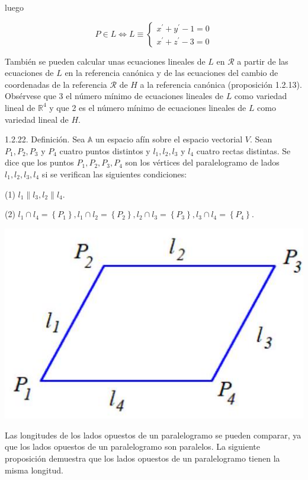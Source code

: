 \documentclass[12pt, a4paper, ones, notitlepage, openany,titlepage]{article}
\begin{document}
luego

$$
P \in L \Longleftrightarrow L \equiv\left\{\begin{array}{l}
x^{\prime}+y^{\prime}-1=0 \\
x^{\prime}+z^{\prime}-3=0
\end{array}\right.
$$

También se pueden calcular unas ecuaciones lineales de $L$ en $\mathcal{R}$ a partir de las ecuaciones de $L$ en la referencia canónica y de las ecuaciones del cambio de coordenadas de la referencia $\mathcal{R}$ de $H$ a la referencia canónica (proposición 1.2.13). Obsérvese que 3 el número mínimo de ecuaciones lineales de $L$ como variedad lineal de $\mathbb{R}^{4}$ y que 2 es el número mínimo de ecuaciones lineales de $L$ como variedad lineal de $H$.

1.2.22. Definición. Sea $\mathbb{A}$ un espacio afín sobre el espacio vectorial $V$. Sean $P_{1}, P_{2}, P_{3}$ y $P_{4}$ cuatro puntos distintos y $l_{1}, l_{2}, l_{3}$ y $l_{4}$ cuatro rectas distintas. Se dice que los puntos $P_{1}, P_{2}, P_{3}, P_{4}$ son los vértices del paralelogramo de lados $l_{1}, l_{2}, l_{3}, l_{4}$ si se verifican las siguientes condiciones:

(1) $l_{1}\left\|l_{3}, l_{2}\right\| l_{4}$.

(2) $l_{1} \cap l_{4}=\left\{P_{1}\right\}, l_{1} \cap l_{2}=\left\{P_{2}\right\}, l_{2} \cap l_{3}=\left\{P_{3}\right\}, l_{3} \cap l_{4}=\left\{P_{4}\right\}$.

\begin{center}
\includegraphics[max width=\textwidth]{2023_03_01_7659aec5e35f9a9b2d3cg-19}
\end{center}

Las longitudes de los lados opuestos de un paralelogramo se pueden comparar, ya que los lados opuestos de un paralelogramo son paralelos. La siguiente proposición demuestra que los lados opuestos de un paralelogramo tienen la misma longitud.
\end{document}
